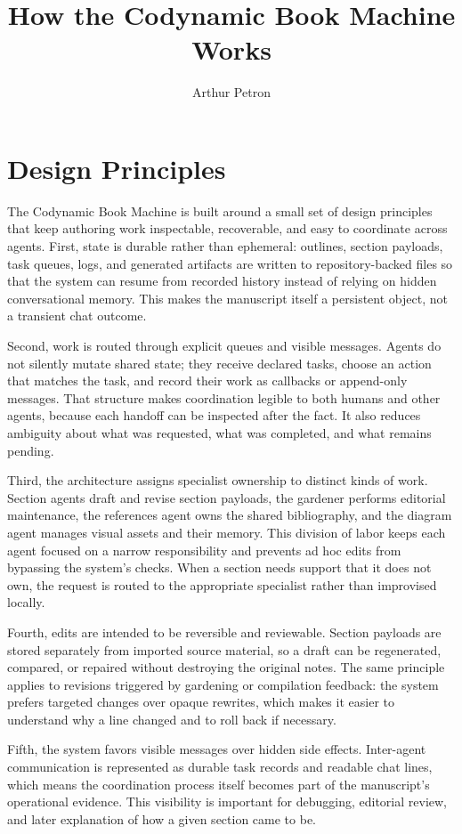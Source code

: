 \documentclass[11pt]{article}
\title{How the Codynamic Book Machine Works}
\author{Arthur Petron}
\begin{document}
\section*{Design Principles}

The Codynamic Book Machine is built around a small set of design principles that keep authoring work inspectable, recoverable, and easy to coordinate across agents. First, state is durable rather than ephemeral: outlines, section payloads, task queues, logs, and generated artifacts are written to repository-backed files so that the system can resume from recorded history instead of relying on hidden conversational memory. This makes the manuscript itself a persistent object, not a transient chat outcome.

Second, work is routed through explicit queues and visible messages. Agents do not silently mutate shared state; they receive declared tasks, choose an action that matches the task, and record their work as callbacks or append-only messages. That structure makes coordination legible to both humans and other agents, because each handoff can be inspected after the fact. It also reduces ambiguity about what was requested, what was completed, and what remains pending.

Third, the architecture assigns specialist ownership to distinct kinds of work. Section agents draft and revise section payloads, the gardener performs editorial maintenance, the references agent owns the shared bibliography, and the diagram agent manages visual assets and their memory. This division of labor keeps each agent focused on a narrow responsibility and prevents ad hoc edits from bypassing the system's checks. When a section needs support that it does not own, the request is routed to the appropriate specialist rather than improvised locally.

Fourth, edits are intended to be reversible and reviewable. Section payloads are stored separately from imported source material, so a draft can be regenerated, compared, or repaired without destroying the original notes. The same principle applies to revisions triggered by gardening or compilation feedback: the system prefers targeted changes over opaque rewrites, which makes it easier to understand why a line changed and to roll back if necessary.

Fifth, the system favors visible messages over hidden side effects. Inter-agent communication is represented as durable task records and readable chat lines, which means the coordination process itself becomes part of the manuscript's operational evidence. This visibility is important for debugging, editorial review, and later explanation of how a given section came to be.
\end{document}
